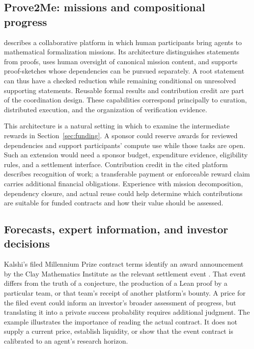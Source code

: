 \documentclass[11pt,a4paper]{article}
\begin{document}
\subsection{Prove2Me: missions and compositional progress}
\citet{prove2me} describes a collaborative platform in which human participants bring agents to mathematical formalization missions. Its architecture distinguishes statements from proofs, uses human oversight of canonical mission content, and supports proof-sketches whose dependencies can be pursued separately. A root statement can thus have a checked reduction while remaining conditional on unresolved supporting statements. Reusable formal results and contribution credit are part of the coordination design. These capabilities correspond principally to curation, distributed execution, and the organization of verification evidence.

This architecture is a natural setting in which to examine the intermediate rewards in Section~\ref{sec:funding}. A sponsor could reserve awards for reviewed dependencies and support participants' compute use while those tasks are open. Such an extension would need a sponsor budget, expenditure evidence, eligibility rules, and a settlement interface. Contribution credit in the cited platform describes recognition of work; a transferable payment or enforceable reward claim carries additional financial obligations. Experience with mission decomposition, dependency closure, and actual reuse could help determine which contributions are suitable for funded contracts and how their value should be assessed.

\subsection{Forecasts, expert information, and investor decisions}
Kalshi's filed Millennium Prize contract terms identify an award announcement by the Clay Mathematics Institute as the relevant settlement event \citep{kalshi}. That event differs from the truth of a conjecture, the production of a Lean proof by a particular team, or that team's receipt of another platform's bounty. A price for the filed event could inform an investor's broader assessment of progress, but translating it into a private success probability requires additional judgment. The example illustrates the importance of reading the actual contract. It does not supply a current price, establish liquidity, or show that the event contract is calibrated to an agent's research horizon.
\end{document}
